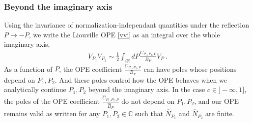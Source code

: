 \documentclass[12pt, a4paper, notitlepage, twoside]{report}
\numberwithin{equation}{section}
\theoremstyle{break}
\begin{document}
\subsubsection{Beyond the imaginary axis}

Using the invariance of normalization-independant quantities under the reflection $P\to -P$, we write the Liouville OPE \eqref{vvi} as an integral over the whole imaginary axis,
\begin{align}
 V_{P_1}V_{P_2} \sim \frac12\int_{i{\mathbb{R}}} dP \frac{C_{P_1,P_2,P}}{B_P} V_P\ .
 \label{vvir}
\end{align}
As a function of $P$, the OPE coefficient $\frac{C_{P_1,P_2,P}}{B_P}$ can have poles whose positions depend on $P_1,P_2$. 
And these poles control how the OPE behaves when we analytically continue $P_1,P_2$ beyond the imaginary axis. In the case $c\in ]-\infty, 1]$, the poles of the OPE coefficient $\frac{\hat C_{P_1,P_2,P}}{\hat B_P}$ do not depend on $P_1,P_2$, and our OPE remains valid as written for any $P_1,P_2\in\mathbb{C}$ such that $\hat N_{P_1}$ and $\hat N_{P_2}$ are finite.
\end{document}
